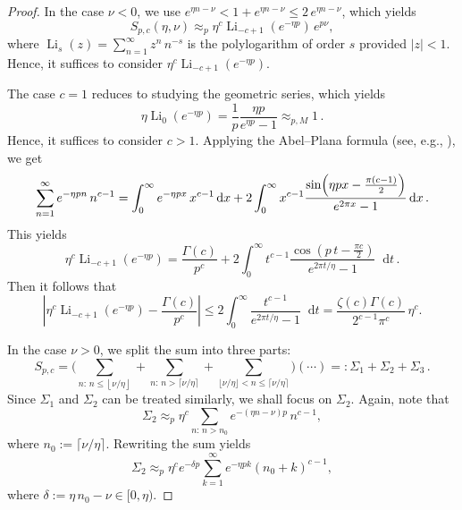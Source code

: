 \documentclass[11pt]{amsart}
\theoremstyle{plain}
\theoremstyle{definition}
\newcommand		{\lt}			{\left}				%
\newcommand		{\rt}			{\right}			%
\renewcommand	{\(}			{\lt(}
\renewcommand	{\)}			{\rt)}
\newcommand		{\floor}[1]		{\lt\lfloor{#1}\rt\rfloor}
\newcommand		{\n}[1]			{\lt\lvert #1 \rt\rvert}
\renewcommand		{\d}		{\mathop{}\!\mathrm{d}}		%
\begin{document}
	\begin{proof}
		In the case $\nu<0$, we use $e^{\eta n-\nu} < 1 + e^{\eta n-\nu} \le 2 \, e^{\eta n-\nu}$, which yields
		\begin{equation*}
			S_{p,c}(\eta,\nu) \approx_{p} \eta^c \operatorname{Li}_{-c+1}(e^{-\eta p})\, e^{p\nu},
		\end{equation*}
		where $\operatorname{Li}_{s}(z) = \sum^\infty_{n=1} z^n\, n^{-s}$ is the polylogarithm of order $s$ provided $\n{z}<1$. Hence, it suffices to consider $\eta^c \operatorname{Li}_{-c+1}(e^{-\eta p})$.
	
		The case $c=1$ reduces to studying the geometric series, which yields 
		\begin{equation*}
			\eta\operatorname{Li}_0(e^{-\eta p}) = \frac{1}{p}\frac{\eta p }{e^{\eta p}-1} \approx_{p, M} 1 \, .
		\end{equation*} 
		Hence, it suffices to consider $c>1$. Applying the Abel--Plana formula (see, e.g., \cite[Section 8.3]{olver_asymptotics_1997}), we get
		\begin{equation*}
			\sum^\infty_{n=1} e^{-\eta p n}\, n^{c-1} = \int_0^\infty e^{-\eta p x} \, x^{c-1}\d x+2\int^\infty_0 x^{c-1} \frac{\sin\Bigl(\eta p x - \frac{\pi (c-1)}{2}\Bigr)}{e^{2\pi x}-1}\d x \, .
		\end{equation*}
		This yields 
		\begin{equation*}
			\eta^c\operatorname{Li}_{-c+1}(e^{-\eta p}) = \frac{\Gamma(c)}{p^c}+2\int^\infty_0 t^{c-1} \frac{\cos(p\,t - \frac{\pi c}{2})}{e^{2\pi t/\eta}-1}\d t \, .
		\end{equation*}
		Then it follows that 
		\begin{equation}\label{est:polylogarithm}
			\n{ \eta^c \operatorname{Li}_{-c+1}(e^{-\eta p}) - \frac{\Gamma(c)}{p^c}} \leq 2\int^\infty_0 \frac{t^{c-1}}{e^{2\pi  t/ \eta}-1}\d t
			= \frac{\zeta(c)\Gamma(c)}{2^{c-1}\pi^c} \, \eta^c .
		\end{equation}
	
		In the case $\nu>0$, we split the sum into three parts:
		\begin{equation}\label{eq:3_split_sum}
			S_{p,c} = \Biggl(\sum_{n:\, n\le \floor{\nu/\eta}}+ \sum_{n:\, n> \lceil\nu/\eta\rceil} + \sum_{\lfloor\nu/\eta\rfloor <n \le \lceil\nu/\eta\rceil}\Biggr)(\cdots)=: \Sigma_1+\Sigma_2+\Sigma_3\,.
		\end{equation}
		Since $\Sigma_1$ and $\Sigma_2$ can be treated similarly, we shall focus on $\Sigma_2$. Again, note that 
		\begin{equation*}
			\Sigma_2 \approx_p \eta^c \sum_{n:\, n> n_0} e^{-(\eta n-\nu)p} \, n^{c-1},
		\end{equation*}
		where $n_0 := \lceil\nu/\eta\rceil$. Rewriting the sum yields 
		\begin{equation*}
			\Sigma_2 \approx_p \eta^c e^{-\delta p}\sum_{k=1}^\infty e^{-\eta p k} \lt(n_0+k\rt)^{c-1},
		\end{equation*}
		where $\delta:=\eta \,n_0 - \nu \in [0, \eta)$.


\end{proof}
\end{document}
